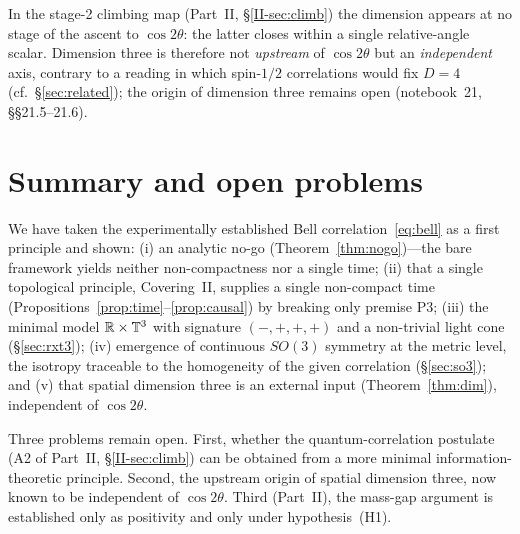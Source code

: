 \documentclass[11pt]{article}
\begin{document}
\begin{remark}\label{rem:orthogonal}
In the stage-2 climbing map (Part~II, \S\ref{II-sec:climb}) the dimension appears at no stage
of the ascent to $\cos2\theta$: the latter closes within a single relative-angle scalar.
Dimension three is therefore not \emph{upstream} of $\cos2\theta$ but an \emph{independent}
axis, contrary to a reading in which spin-$1/2$ correlations would fix $D{=}4$
(cf.\ \S\ref{sec:related}); the origin of dimension three remains open (notebook~21,
\S\S21.5--21.6).
\end{remark}

\section{Summary and open problems}\label{sec:summary}
We have taken the experimentally established Bell correlation~\eqref{eq:bell} as a first
principle and shown: (i) an analytic no-go (Theorem~\ref{thm:nogo})---the bare framework
yields neither non-compactness nor a single time; (ii) that a single topological
principle, Covering~II, supplies a single non-compact time
(Propositions~\ref{prop:time}--\ref{prop:causal}) by breaking only premise P3; (iii) the
minimal model $\mathbb{R}\times\mathbb{T}^{3}$ with signature $(-,+,+,+)$ and a non-trivial light cone
(\S\ref{sec:rxt3}); (iv) emergence of continuous $SO(3)$ symmetry at the metric level, the
isotropy traceable to the homogeneity of the given correlation
(\S\ref{sec:so3}); and (v) that spatial dimension three is an external input
(Theorem~\ref{thm:dim}), independent of $\cos2\theta$.

Three problems remain open. First, whether the quantum-correlation postulate (A2 of
Part~II, \S\ref{II-sec:climb}) can be obtained from a more minimal information-theoretic
principle. Second, the upstream origin of spatial dimension three, now known to be
independent of $\cos2\theta$. Third (Part~II), the mass-gap argument is established only as
positivity and only under hypothesis~(H1).
\end{document}
